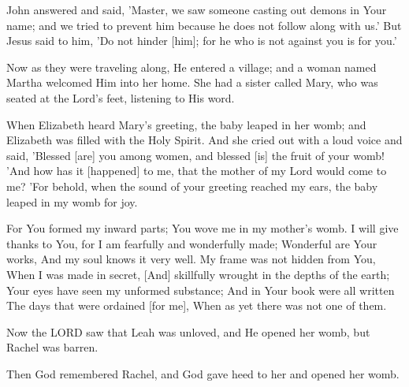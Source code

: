 \begin{scripture}[Luke 9:49-50]
    John answered and said, 'Master, we saw someone casting out demons in Your name; and we tried to prevent him because he does not follow along with us.'
    But Jesus said to him, 'Do not hinder [him]; for he who is not against you is for you.'
\end{scripture}

\begin{scripture}[Luke 10:38-39]
    Now as they were traveling along, He entered a village; and a woman named Martha welcomed Him into her home.
    She had a sister called Mary, who was seated at the Lord's feet, listening to His word.
\end{scripture}

\begin{scripture}[Luke 1:41-44]
    When Elizabeth heard Mary's greeting, the baby leaped in her womb; and Elizabeth was filled with the Holy Spirit.
    And she cried out with a loud voice and said, 'Blessed [are] you among women, and blessed [is] the fruit of your womb!
    'And how has it [happened] to me, that the mother of my Lord would come to me?
    'For behold, when the sound of your greeting reached my ears, the baby leaped in my womb for joy.
\end{scripture}

\begin{scripture}[Psalm 139:13-16]
    For You formed my inward parts; You wove me in my mother's womb.
    I will give thanks to You, for I am fearfully and wonderfully made; Wonderful are Your works, And my soul knows it very well.
    My frame was not hidden from You, When I was made in secret, [And] skillfully wrought in the depths of the earth;
    Your eyes have seen my unformed substance; And in Your book were all written The days that were ordained [for me], When as yet there was not one of them.
\end{scripture}

\begin{scripture}[Genesis 29:31]
    Now the LORD saw that Leah was unloved, and He opened her womb, but Rachel was barren.
\end{scripture}

\begin{scripture}[Genesis 30:22]
    Then God remembered Rachel, and God gave heed to her and opened her womb.
\end{scripture}

